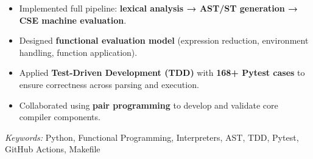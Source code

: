 \noindent
{}

\noindent

\begin{itemize}[leftmargin=*, itemsep=0.15em, topsep=0.05em]
    \item Implemented full pipeline: \textbf{lexical analysis → AST/ST generation → CSE machine evaluation}.
    
    \item Designed \textbf{functional evaluation model} (expression reduction, environment handling, function application).
    
    \item Applied \textbf{Test-Driven Development (TDD)} with \textbf{168+ Pytest cases} to ensure correctness across parsing and execution.
    
    \item Collaborated using \textbf{pair programming} to develop and validate core compiler components.
\end{itemize}

\noindent
\textit{Keywords:} Python, Functional Programming, Interpreters, AST, TDD, Pytest, GitHub Actions, Makefile